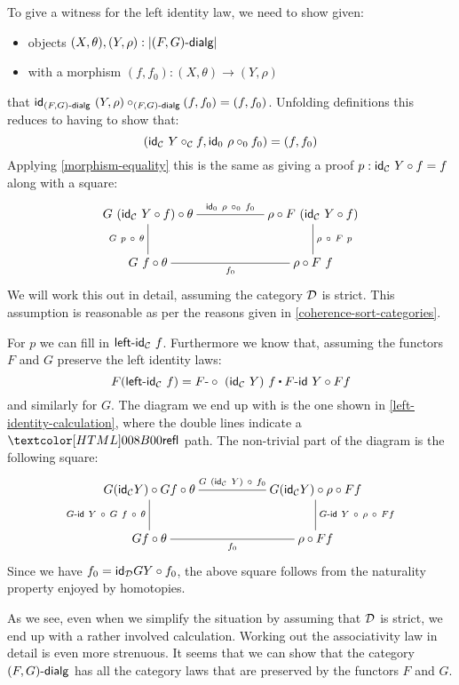 To give a witness for the left identity law, we need to show given:
\begin{itemize}
\item objects $(X,\theta), (Y,\rho) : |\dialgcat{F}{G}|$
\item with a morphism $(f,f_0) : (X,\theta) \to (Y,\rho)$
\end{itemize}
that $\id_{\dialgcat{F}{G}}\ (Y,\rho) \circ_{\dialgcat{F}{G}} (f,f_0) = (f,f_0)$. Unfolding definitions this reduces to having to show that:
$$
(\id_{\Cc}\ Y \circ_{\Cc} f , \id_0\ \rho \circ_0 f_0) = (f,f_0)
$$
Applying \cref{morphism-equality} this is the same as giving a proof $p : \id_{\Cc}\ Y \circ f = f$ along with a square:
$$
\xymatrix{
  G\ (\id_{\Cc}\ Y \circ f) \circ \theta
  \ar@{-}[rr]^{\id_0\ \rho\ \circ_0\ f_0}
  \ar@{-}[d]_{G\ p\ \circ\ \theta}
  &&\rho \circ F\ (\id_{\Cc}\ Y \circ f)
  \ar@{-}[d]^{\rho\ \circ\ F\ p}
  \\
  G\ f \circ \theta
  \ar@{-}[rr]_{f_0}
  &&\rho \circ F\ f
}
$$
We will work this out in detail, assuming the category $\mathcal{D}$ is
strict. This assumption is reasonable as per the reasons given in
\cref{coherence-sort-categories}.

For $p$ we can fill in $\leftid_{\Cc}\ f$. Furthermore we know that,
assuming the functors $F$ and $G$ preserve the left identity laws:
$$
F (\leftid_{\Cc}\ f) = \trans{\Fcomp\ (\id_{\Cc}\ Y)\ f}{\Fid\ Y \circ Ff}
$$
and similarly for $G$. The diagram we end up with is the one shown in
\cref{left-identity-calculation}, where the double lines indicate a
$\refl$ path. The non-trivial part of the diagram is the following
square:
$$
\xymatrix{
G (\id_{\Cc} Y) \circ Gf \circ \theta
\ar@{-}[rr]^{G\ (\id_{\Cc}\ Y)\ \circ\ f_0}
\ar@{-}[d]_{\Gid\ Y\ \circ\ G\ f\ \circ\ \theta}
&&G (\id_{\Cc} Y) \circ \rho \circ Ff
\ar@{-}[d]^{\Gid\ Y\ \circ\ \rho\ \circ\ Ff}
\\
Gf \circ \theta
\ar@{-}[rr]_{f_0}
&&\rho \circ Ff
}
$$
Since we have $f_0 = \id_{\Dd} GY \circ f_0$, the above square follows
from the naturality property enjoyed by homotopies.

As we see, even when we simplify the situation by assuming that $\mathcal{D}$
is strict, we end up with a rather involved calculation.  Working out
the associativity law in detail is even more strenuous. It seems that
we can show that the category $\dialgcat{F}{G}$ has all the category
laws that are preserved by the functors $F$ and $G$.

